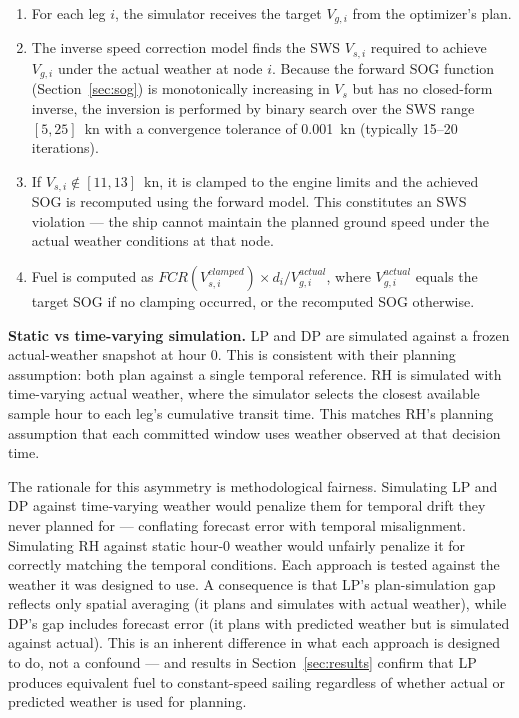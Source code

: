 \documentclass[review]{elsarticle}
\begin{document}
\begin{enumerate}
    \item For each leg $i$, the simulator receives the target $V_{g,i}$ from the optimizer's plan.
    \item The inverse speed correction model finds the SWS $V_{s,i}$ required to achieve $V_{g,i}$ under the actual weather at node $i$. Because the forward SOG function (Section~\ref{sec:sog}) is monotonically increasing in $V_s$ but has no closed-form inverse, the inversion is performed by binary search over the SWS range $[5, 25]$~kn with a convergence tolerance of 0.001~kn (typically 15--20 iterations).
    \item If $V_{s,i} \notin [11, 13]$~kn, it is clamped to the engine limits and the achieved SOG is recomputed using the forward model. This constitutes an SWS violation --- the ship cannot maintain the planned ground speed under the actual weather conditions at that node.
    \item Fuel is computed as $FCR(V_{s,i}^{clamped}) \times d_i / V_{g,i}^{actual}$, where $V_{g,i}^{actual}$ equals the target SOG if no clamping occurred, or the recomputed SOG otherwise.
\end{enumerate}

\textbf{Static vs time-varying simulation.} LP and DP are simulated against a frozen actual-weather snapshot at hour 0. This is consistent with their planning assumption: both plan against a single temporal reference. RH is simulated with time-varying actual weather, where the simulator selects the closest available sample hour to each leg's cumulative transit time. This matches RH's planning assumption that each committed window uses weather observed at that decision time.

The rationale for this asymmetry is methodological fairness. Simulating LP and DP against time-varying weather would penalize them for temporal drift they never planned for --- conflating forecast error with temporal misalignment. Simulating RH against static hour-0 weather would unfairly penalize it for correctly matching the temporal conditions. Each approach is tested against the weather it was designed to use. A consequence is that LP's plan-simulation gap reflects only spatial averaging (it plans and simulates with actual weather), while DP's gap includes forecast error (it plans with predicted weather but is simulated against actual). This is an inherent difference in what each approach is designed to do, not a confound --- and results in Section~\ref{sec:results} confirm that LP produces equivalent fuel to constant-speed sailing regardless of whether actual or predicted weather is used for planning.
\end{document}
